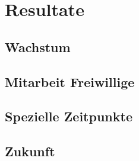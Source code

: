 \chapter{Resultate}

\section{Wachstum}

\section{Mitarbeit Freiwillige}

\section{Spezielle Zeitpunkte}

\section{Zukunft}
